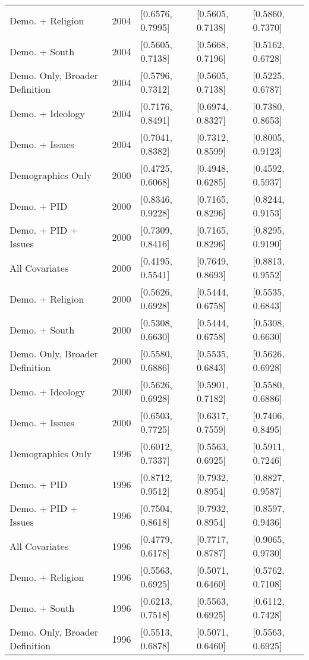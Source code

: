 \begin{longtable}{lrlll}
  Demo. + Religion & 2004 & [0.6576, 0.7995] & [0.5605, 0.7138] & [0.5860, 0.7370] \\ 
  Demo. + South & 2004 & [0.5605, 0.7138] & [0.5668, 0.7196] & [0.5162, 0.6728] \\ 
  Demo. Only, Broader Definition & 2004 & [0.5796, 0.7312] & [0.5605, 0.7138] & [0.5225, 0.6787] \\ 
  Demo. + Ideology & 2004 & [0.7176, 0.8491] & [0.6974, 0.8327] & [0.7380, 0.8653] \\ 
  Demo. + Issues & 2004 & [0.7041, 0.8382] & [0.7312, 0.8599] & [0.8005, 0.9123] \\ 
  Demographics Only & 2000 & [0.4725, 0.6068] & [0.4948, 0.6285] & [0.4592, 0.5937] \\ 
  Demo. + PID & 2000 & [0.8346, 0.9228] & [0.7165, 0.8296] & [0.8244, 0.9153] \\ 
  Demo. + PID + Issues & 2000 & [0.7309, 0.8416] & [0.7165, 0.8296] & [0.8295, 0.9190] \\ 
  All Covariates & 2000 & [0.4195, 0.5541] & [0.7649, 0.8693] & [0.8813, 0.9552] \\ 
  Demo. + Religion & 2000 & [0.5626, 0.6928] & [0.5444, 0.6758] & [0.5535, 0.6843] \\ 
  Demo. + South & 2000 & [0.5308, 0.6630] & [0.5444, 0.6758] & [0.5308, 0.6630] \\ 
  Demo. Only, Broader Definition & 2000 & [0.5580, 0.6886] & [0.5535, 0.6843] & [0.5626, 0.6928] \\ 
  Demo. + Ideology & 2000 & [0.5626, 0.6928] & [0.5901, 0.7182] & [0.5580, 0.6886] \\ 
  Demo. + Issues & 2000 & [0.6503, 0.7725] & [0.6317, 0.7559] & [0.7406, 0.8495] \\ 
  Demographics Only & 1996 & [0.6012, 0.7337] & [0.5563, 0.6925] & [0.5911, 0.7246] \\ 
  Demo. + PID & 1996 & [0.8712, 0.9512] & [0.7932, 0.8954] & [0.8827, 0.9587] \\ 
  Demo. + PID + Issues & 1996 & [0.7504, 0.8618] & [0.7932, 0.8954] & [0.8597, 0.9436] \\ 
  All Covariates & 1996 & [0.4779, 0.6178] & [0.7717, 0.8787] & [0.9065, 0.9730] \\ 
  Demo. + Religion & 1996 & [0.5563, 0.6925] & [0.5071, 0.6460] & [0.5762, 0.7108] \\ 
  Demo. + South & 1996 & [0.6213, 0.7518] & [0.5563, 0.6925] & [0.6112, 0.7428] \\ 
  Demo. Only, Broader Definition & 1996 & [0.5513, 0.6878] & [0.5071, 0.6460] & [0.5563, 0.6925] \\ 

\end{longtable}

